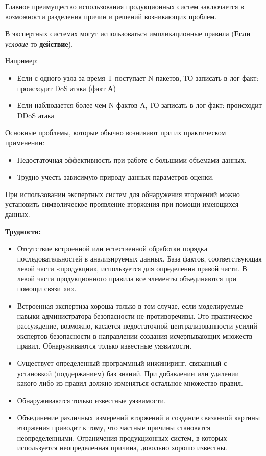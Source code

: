 Главное преимущество использования продукционных систем заключается в возможности разделения причин и
решений возникающих проблем.

В экспертных системах могут использоваться импликационные правила (\textbf{Если} \textit{условие} то
\textbf{действие}).

Например:
\begin{itemize}
	\item Если с одного узла за время T поступает N пакетов, ТО записать в лог факт:
	происходит DoS атака (факт А)

	\item Если наблюдается более чем N фактов А, ТО записать в лог факт: происходит DDoS атака
\end{itemize}

Основные проблемы, которые обычно возникают при их практическом применении:
\begin{itemize}
    \item Недостаточная эффективность при работе с большими объемами данных.
    \item Трудно учесть зависимую природу данных параметров оценки.
\end{itemize}

При использовании экспертных систем для обнаружения вторжений можно установить символическое
проявление вторжения при помощи имеющихся данных.

\textbf{Трудности:}
\begin{itemize}
    \item Отсутствие встроенной или естественной обработки порядка последовательностей в анализируемых
    данных. База фактов, соответствующая левой части «продукции», используется для определения правой
    части. В левой части продукционного правила все элементы объединяются при помощи связи «и».
    \item Встроенная экспертиза хороша только в том случае, если моделируемые навыки администратора
    безопасности не противоречивы. Это практическое рассуждение, возможно, касается
    недостаточной централизованности усилий экспертов безопасности в направлении создания
    исчерпывающих множеств правил. Обнаруживаются только известные уязвимости.
    \item Существует определенный программный инжиниринг, связанный с установкой (поддержанием) баз знаний.
    При добавлении или удалении какого-либо из правил должно изменяться остальное множество правил.
    \item Обнаруживаются только известные уязвимости.
    \item Объединение различных измерений вторжений и создание связанной картины вторжения приводит к
    тому, что частные причины становятся неопределенными. Ограничения продукционных систем, в
    которых используется неопределенная причина, довольно хорошо известны.
\end{itemize}
\autocite{BeynonDavies}

